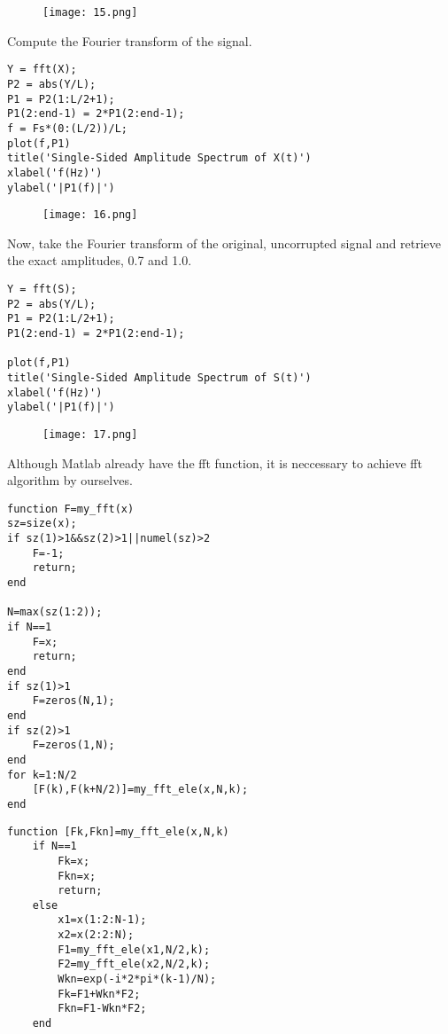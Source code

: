 \documentclass[12pt,a4paper]{article}
\begin{document}
\begin{figure}[hbtp]
\centering
\texttt{[image: 15.png]}
\end{figure}

\newpage
Compute the Fourier transform of the signal.
\lstset{language=Matlab}
\begin{lstlisting}
Y = fft(X);
P2 = abs(Y/L);
P1 = P2(1:L/2+1);
P1(2:end-1) = 2*P1(2:end-1);
f = Fs*(0:(L/2))/L;
plot(f,P1) 
title('Single-Sided Amplitude Spectrum of X(t)')
xlabel('f(Hz)')
ylabel('|P1(f)|')
\end{lstlisting}

\begin{figure}[hbtp]
\centering
\texttt{[image: 16.png]}
\end{figure}

Now, take the Fourier transform of the original, uncorrupted signal and retrieve the exact amplitudes, 0.7 and 1.0.
\lstset{language=Matlab}
\begin{lstlisting}
Y = fft(S);
P2 = abs(Y/L);
P1 = P2(1:L/2+1);
P1(2:end-1) = 2*P1(2:end-1);

plot(f,P1) 
title('Single-Sided Amplitude Spectrum of S(t)')
xlabel('f(Hz)')
ylabel('|P1(f)|')
\end{lstlisting}

\begin{figure}[hbtp]
\centering
\texttt{[image: 17.png]}
\end{figure}

\newpage
Although Matlab already have the fft function, it is neccessary to achieve fft algorithm by ourselves.
\lstset{language=Matlab}
\begin{lstlisting}
function F=my_fft(x)
sz=size(x);
if sz(1)>1&&sz(2)>1||numel(sz)>2
    F=-1;
    return;
end

N=max(sz(1:2));
if N==1
    F=x;
    return;
end
if sz(1)>1
    F=zeros(N,1);
end
if sz(2)>1
    F=zeros(1,N);
end
for k=1:N/2
    [F(k),F(k+N/2)]=my_fft_ele(x,N,k);
end
\end{lstlisting}

\newpage
\lstset{language=Matlab}
\begin{lstlisting}
function [Fk,Fkn]=my_fft_ele(x,N,k) 
    if N==1
        Fk=x;
        Fkn=x;
        return;
    else
        x1=x(1:2:N-1);
        x2=x(2:2:N);
        F1=my_fft_ele(x1,N/2,k);
        F2=my_fft_ele(x2,N/2,k);
        Wkn=exp(-i*2*pi*(k-1)/N);
        Fk=F1+Wkn*F2;
        Fkn=F1-Wkn*F2;
    end
\end{lstlisting}
\end{document}
